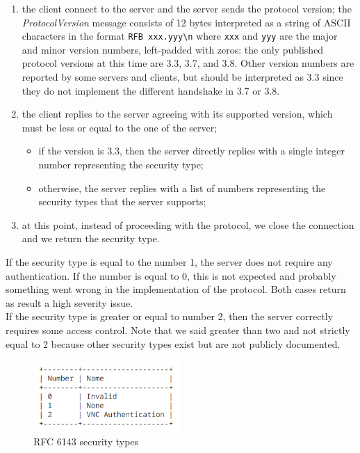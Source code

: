 \begin{enumerate}
  \item the client connect to the server and the server sends the protocol version; the \textit{ProtocolVersion} message consists of 12 bytes interpreted as a string of ASCII characters in the format \texttt{RFB xxx.yyy\textbackslash n} where \texttt{xxx} and \texttt{yyy} are the major and minor version numbers, left-padded with zeros: the only published protocol versions at this time are 3.3, 3.7, and 3.8. Other version numbers are reported by some servers and clients, but should be interpreted as 3.3 since they do not implement the different handshake in 3.7 or 3.8.
  \item the client replies to the server agreeing with its supported version, which must be less or equal to the one of the server;
        \begin{itemize}
          \item if the version is 3.3, then the server directly replies with a single integer number representing the security type;
          \item otherwise, the server replies with a list of numbers representing the security types that the server supports;
        \end{itemize}
  \item at this point, instead of proceeding with the protocol, we close the connection and we return the security type.
\end{enumerate}

If the security type is equal to the number 1, the server does not require any authentication. If the number is equal to 0, this is not expected and probably something went wrong in the implementation of the protocol. Both cases return as result a high severity issue. \\
If the security type is greater or equal to number 2, then the server correctly requires some access control. Note that we said greater than two and not strictly equal to 2 because other security types exist but are not publicly documented.

\begin{figure}[ht]
  \centering
  \includegraphics[width=0.5\textwidth]{chapters/05/assets/rfc6143-security-types}
  \caption{RFC 6143 security types}
  \label{fig:rfc6143-security-types}
\end{figure}

